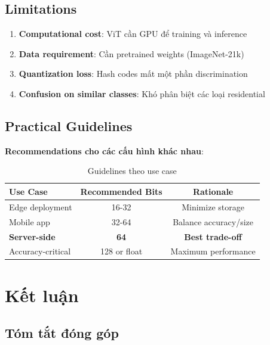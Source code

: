 \documentclass[12pt,a4paper]{article}
\begin{document}
\subsection{Limitations}

\begin{enumerate}
    \item \textbf{Computational cost}: ViT cần GPU để training và inference
    \item \textbf{Data requirement}: Cần pretrained weights (ImageNet-21k)
    \item \textbf{Quantization loss}: Hash codes mất một phần discrimination
    \item \textbf{Confusion on similar classes}: Khó phân biệt các loại residential
\end{enumerate}

\subsection{Practical Guidelines}

\textbf{Recommendations cho các cấu hình khác nhau}:

\begin{table}[H]
\centering
\caption{Guidelines theo use case}
\begin{tabular}{lcc}
\toprule
\textbf{Use Case} & \textbf{Recommended Bits} & \textbf{Rationale} \\
\midrule
Edge deployment & 16-32 & Minimize storage \\
Mobile app & 32-64 & Balance accuracy/size \\
\textbf{Server-side} & \textbf{64} & \textbf{Best trade-off} \\
Accuracy-critical & 128 or float & Maximum performance \\
\bottomrule
\end{tabular}
\end{table}

\section{Kết luận}

\subsection{Tóm tắt đóng góp}
\end{document}
